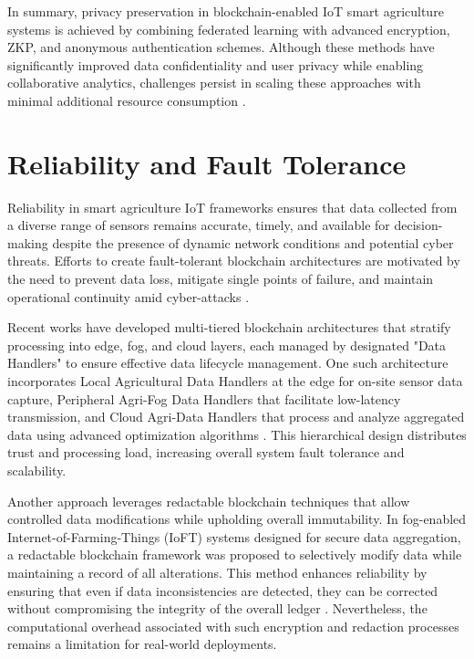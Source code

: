 \documentclass[12pt,onecolumn]{IEEEtran} %
\begin{document}
In summary, privacy preservation in blockchain-enabled IoT smart agriculture systems is achieved by combining federated learning with advanced encryption, ZKP, and anonymous authentication schemes. Although these methods have significantly improved data confidentiality and user privacy while enabling collaborative analytics, challenges persist in scaling these approaches with minimal additional resource consumption \cite{soy2025blockchainintegrationin}.

\section{Reliability and Fault Tolerance}
Reliability in smart agriculture IoT frameworks ensures that data collected from a diverse range of sensors remains accurate, timely, and available for decision-making despite the presence of dynamic network conditions and potential cyber threats. Efforts to create fault-tolerant blockchain architectures are motivated by the need to prevent data loss, mitigate single points of failure, and maintain operational continuity amid cyber-attacks \cite{aliyu2023blockchainbasedsmartfarm}.

Recent works have developed multi-tiered blockchain architectures that stratify processing into edge, fog, and cloud layers, each managed by designated "Data Handlers" to ensure effective data lifecycle management. One such architecture incorporates Local Agricultural Data Handlers at the edge for on-site sensor data capture, Peripheral Agri-Fog Data Handlers that facilitate low-latency transmission, and Cloud Agri-Data Handlers that process and analyze aggregated data using advanced optimization algorithms \cite{thiruvenkatasamy2025anonlinetool}. This hierarchical design distributes trust and processing load, increasing overall system fault tolerance and scalability.

Another approach leverages redactable blockchain techniques that allow controlled data modifications while upholding overall immutability. In fog-enabled Internet-of-Farming-Things (IoFT) systems designed for secure data aggregation, a redactable blockchain framework was proposed to selectively modify data while maintaining a record of all alterations. This method enhances reliability by ensuring that even if data inconsistencies are detected, they can be corrected without compromising the integrity of the overall ledger \cite{mishra2023redactableblockchainassistedsecure}. Nevertheless, the computational overhead associated with such encryption and redaction processes remains a limitation for real-world deployments.
\end{document}
